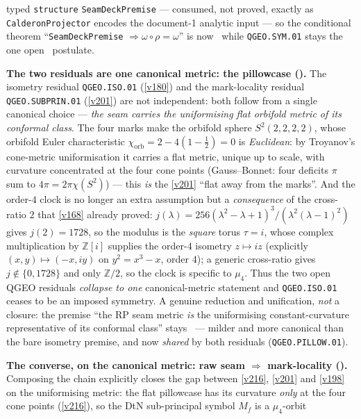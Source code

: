 \documentclass[11pt,a4paper]{article}
\newcommand{\Z}{\mathbb Z}
\begin{document}
\begin{keybox}
typed \texttt{structure} \texttt{SeamDeckPremise} --- consumed, not proved, exactly as
\texttt{CalderonProjector} encodes the document-1 analytic input --- so the conditional theorem
``\texttt{SeamDeckPremise} $\Rightarrow\omega\circ\rho=\omega$'' is now \mE\ while
\texttt{QGEO.SYM.01} stays the one open \mO\ postulate.
\par\smallskip\noindent\textbf{The two residuals are one canonical metric: the pillowcase
().} The isometry residual \texttt{QGEO.ISO.01} (\vref{v180}) and the
mark-locality residual \texttt{QGEO.SUBPRIN.01} (\vref{v201}) are not independent: both follow from a
single canonical choice --- \emph{the seam carries the uniformising flat orbifold metric of its conformal
class}. The four marks make the orbifold sphere $S^2(2,2,2,2)$, whose orbifold Euler characteristic
$\chi_{\mathrm{orb}}=2-4(1-\tfrac12)=0$ is \emph{Euclidean}: by Troyanov's cone-metric uniformisation it
carries a flat metric, unique up to scale, with curvature concentrated at the four cone points
(Gauss--Bonnet: four deficits $\pi$ sum to $4\pi=2\pi\chi(S^2)$) --- this \emph{is} the \vref{v201}
``flat away from the marks''. And the order-$4$ clock is no longer an extra assumption but a
\emph{consequence} of the cross-ratio $2$ that \vref{v168} already proved:
$j(\lambda)=256(\lambda^2-\lambda+1)^3/(\lambda^2(\lambda-1)^2)$ gives $j(2)=1728$, so the modulus is the
\emph{square} torus $\tau=i$, whose complex multiplication by $\Z[i]$ supplies the order-$4$ isometry
$z\mapsto iz$ (explicitly $(x,y)\mapsto(-x,iy)$ on $y^2=x^3-x$, order $4$); a generic cross-ratio gives
$j\notin\{0,1728\}$ and only $\Z/2$, so the clock is specific to $\mu_4$. Thus the two open QGEO residuals
\emph{collapse to one} canonical-metric statement and \texttt{QGEO.ISO.01} ceases to be an imposed
symmetry. A genuine reduction and unification, \emph{not} a closure: the premise ``the RP seam metric
\emph{is} the uniformising constant-curvature representative of its conformal class'' stays \mO\ ---
milder and more canonical than the bare isometry premise, and now \emph{shared} by both residuals
(\texttt{QGEO.PILLOW.01}).
\par\smallskip\noindent\textbf{The converse, on the canonical metric: raw seam $\Rightarrow$ mark-locality
().} Composing the chain explicitly closes the gap between
\vref{v216}, \vref{v201} and \vref{v198} on the uniformising metric: the flat pillowcase has its curvature
\emph{only} at the four cone points (\vref{v216}), so the DtN sub-principal symbol $M_f$ is a $\mu_4$-orbit

\end{keybox}
\end{document}
